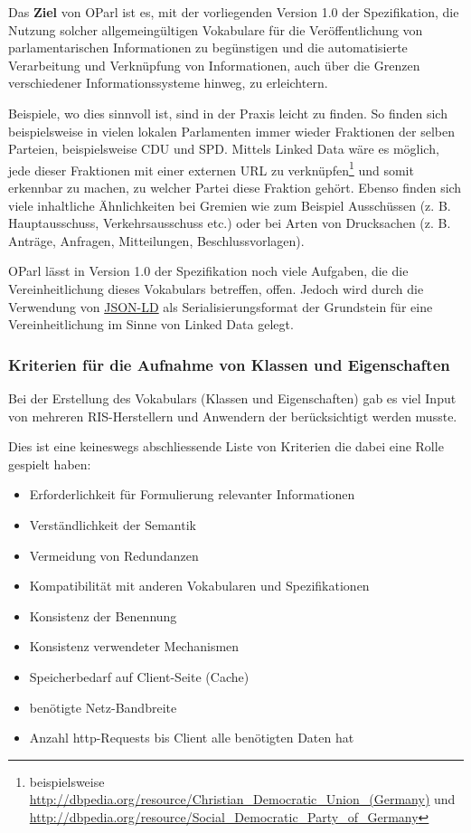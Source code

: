 \documentclass[,a4paper]{article}
\begin{document}
Das \textbf{Ziel} von OParl ist es, mit der vorliegenden Version 1.0 der
Spezifikation, die Nutzung solcher allgemeingültigen Vokabulare für die
Veröffentlichung von parlamentarischen Informationen zu begünstigen und
die automatisierte Verarbeitung und Verknüpfung von Informationen, auch
über die Grenzen verschiedener Informationssysteme hinweg, zu
erleichtern.

Beispiele, wo dies sinnvoll ist, sind in der Praxis leicht zu finden. So
finden sich beispielsweise in vielen lokalen Parlamenten immer wieder
Fraktionen der selben Parteien, beispielsweise CDU und SPD. Mittels
Linked Data wäre es möglich, jede dieser Fraktionen mit einer externen
URL zu verknüpfen\footnote{beispielsweise
  \url{http://dbpedia.org/resource/Christian_Democratic_Union_(Germany)}
  und
  \url{http://dbpedia.org/resource/Social_Democratic_Party_of_Germany}}
und somit erkennbar zu machen, zu welcher Partei diese Fraktion gehört.
Ebenso finden sich viele inhaltliche Ähnlichkeiten bei Gremien wie zum
Beispiel Ausschüssen (z. B. Hauptausschuss, Verkehrsausschuss etc.) oder
bei Arten von Drucksachen (z. B. Anträge, Anfragen, Mitteilungen,
Beschlussvorlagen).

OParl lässt in Version 1.0 der Spezifikation noch viele Aufgaben, die
die Vereinheitlichung dieses Vokabulars betreffen, offen. Jedoch wird
durch die Verwendung von \hyperref[jsonld]{JSON-LD} als
Serialisierungsformat der Grundstein für eine Vereinheitlichung im Sinne
von Linked Data gelegt.

\subsubsection{Kriterien für die Aufnahme von Klassen und
Eigenschaften}\label{kriterien-fuxfcr-die-aufnahme-von-klassen-und-eigenschaften}

Bei der Erstellung des Vokabulars (Klassen und Eigenschaften) gab es
viel Input von mehreren RIS-Herstellern und Anwendern der berücksichtigt
werden musste.

Dies ist eine keineswegs abschliessende Liste von Kriterien die dabei
eine Rolle gespielt haben:

\begin{itemize}
\itemsep1pt\parskip0pt
\item
  Erforderlichkeit für Formulierung relevanter Informationen
\item
  Verständlichkeit der Semantik
\item
  Vermeidung von Redundanzen
\item
  Kompatibilität mit anderen Vokabularen und Spezifikationen
\item
  Konsistenz der Benennung
\item
  Konsistenz verwendeter Mechanismen
\item
  Speicherbedarf auf Client-Seite (Cache)
\item
  benötigte Netz-Bandbreite
\item
  Anzahl http-Requests bis Client alle benötigten Daten hat
\end{itemize}
\end{document}
